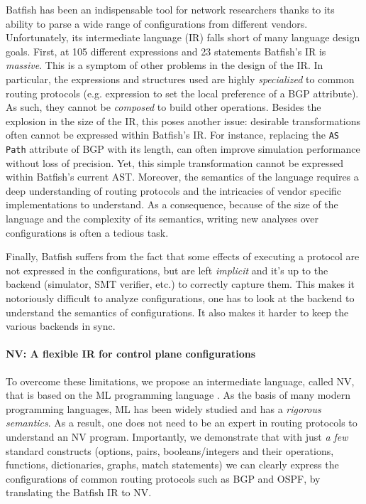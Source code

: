 \documentclass[sigconf,10pt]{acmart}
\begin{document}
Batfish has been an indispensable tool for network researchers thanks
to its ability to parse a wide range of configurations from different
vendors. Unfortunately, its intermediate language (IR) falls short of
many language design goals. First, at 105 different expressions and 23
statements Batfish's IR is \emph{massive}. This is a symptom of other
problems in the design of the IR. In particular, the expressions and
structures used are highly \emph{specialized} to common routing
protocols (e.g. expression to set the local preference of a BGP
attribute). As such, they cannot be \emph{composed} to build other
operations. Besides the explosion in the size of the IR, this poses
another issue: desirable transformations often cannot be expressed
within Batfish's IR. For instance, replacing the \texttt{AS Path}
attribute of BGP with its length, can often improve simulation
performance without loss of precision. Yet, this simple transformation
cannot be expressed within Batfish's current AST.  Moreover, the
semantics of the language requires a deep understanding of routing
protocols and the intricacies of vendor specific implementations to
understand. As a consequence, because of the size of the language and
the complexity of its semantics, writing new analyses over
configurations is often a tedious task. 

Finally, Batfish suffers from the fact that some effects of executing
a protocol are not expressed in the configurations, but are left
\emph{implicit} and it's up to the backend (simulator, SMT verifier,
etc.) to correctly capture them. This makes it notoriously difficult
to analyze configurations, one has to look at the backend to
understand the semantics of configurations. It also makes it harder to
keep the various backends in sync.

\paragraph{NV: A flexible IR for control plane configurations}

To overcome these limitations, we propose an intermediate language,
called NV, that is based on the ML programming language
\cite{milner1978theory}. As the basis of many modern programming
languages, ML has been widely studied and has a \emph{rigorous
  semantics}. As a result, one does not need to be an expert in
routing protocols to understand an NV program. Importantly, we
demonstrate that with just \emph{a few} standard constructs (options,
pairs, booleans/integers and their operations, functions,
dictionaries, graphs, match statements) we can clearly express the
configurations of common routing protocols such as BGP and OSPF, by
translating the Batfish IR to NV. 
\end{document}
